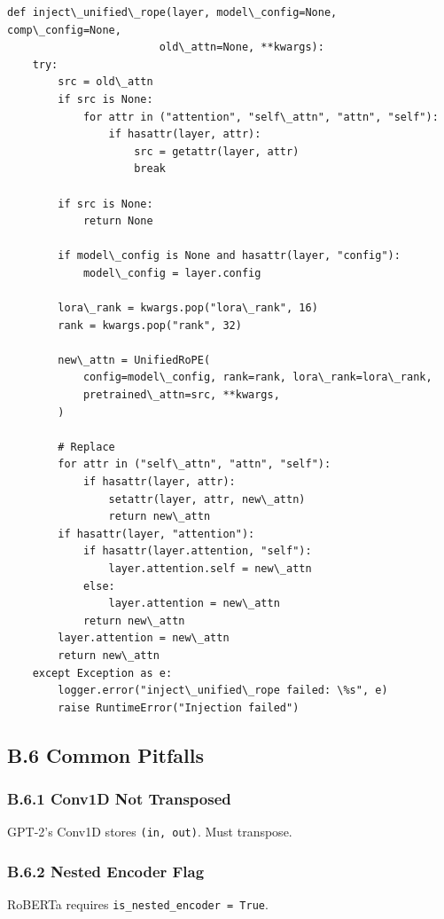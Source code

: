 \begin{lstlisting}
def inject\_unified\_rope(layer, model\_config=None, comp\_config=None,
                        old\_attn=None, **kwargs):
    try:
        src = old\_attn
        if src is None:
            for attr in ("attention", "self\_attn", "attn", "self"):
                if hasattr(layer, attr):
                    src = getattr(layer, attr)
                    break
        
        if src is None:
            return None
        
        if model\_config is None and hasattr(layer, "config"):
            model\_config = layer.config
        
        lora\_rank = kwargs.pop("lora\_rank", 16)
        rank = kwargs.pop("rank", 32)
        
        new\_attn = UnifiedRoPE(
            config=model\_config, rank=rank, lora\_rank=lora\_rank,
            pretrained\_attn=src, **kwargs,
        )
        
        # Replace
        for attr in ("self\_attn", "attn", "self"):
            if hasattr(layer, attr):
                setattr(layer, attr, new\_attn)
                return new\_attn
        if hasattr(layer, "attention"):
            if hasattr(layer.attention, "self"):
                layer.attention.self = new\_attn
            else:
                layer.attention = new\_attn
            return new\_attn
        layer.attention = new\_attn
        return new\_attn
    except Exception as e:
        logger.error("inject\_unified\_rope failed: \%s", e)
        raise RuntimeError("Injection failed")
\end{lstlisting}

\subsection{B.6 Common Pitfalls}

\subsubsection{B.6.1 Conv1D Not Transposed}

GPT-2's Conv1D stores \texttt{(in, out)}. Must transpose.

\subsubsection{B.6.2 Nested Encoder Flag}

RoBERTa requires \texttt{is\_nested\_encoder = True}.

